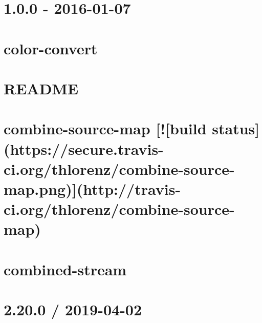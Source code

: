 \documentclass[twoside]{book}
\newcommand{\+}{\discretionary{\mbox{\scriptsize$\hookleftarrow$}}{}{}}
\begin{document}
\chapter{1.0.0 -\/ 2016-\/01-\/07}
\label{md_dsmacc_examples_DRmerge_node_modules_color-convert_CHANGELOG}

\chapter{color-\/convert}
\label{md_dsmacc_examples_DRmerge_node_modules_color-convert_README}

\chapter{R\+E\+A\+D\+ME}
\label{md_dsmacc_examples_DRmerge_node_modules_color-name_README}

\chapter{combine-\/source-\/map \mbox{[}!\mbox{[}build status\mbox{]}(https\+://secure.travis-\/ci.org/thlorenz/combine-\/source-\/map.png)\mbox{]}(http\+://travis-\/ci.org/thlorenz/combine-\/source-\/map)}
\label{md_dsmacc_examples_DRmerge_node_modules_combine-source-map_README}

\chapter{combined-\/stream}
\label{md_dsmacc_examples_DRmerge_node_modules_combined-stream_Readme}

\chapter{2.20.0 / 2019-\/04-\/02}
\label{md_dsmacc_examples_DRmerge_node_modules_commander_CHANGELOG}

\end{document}
